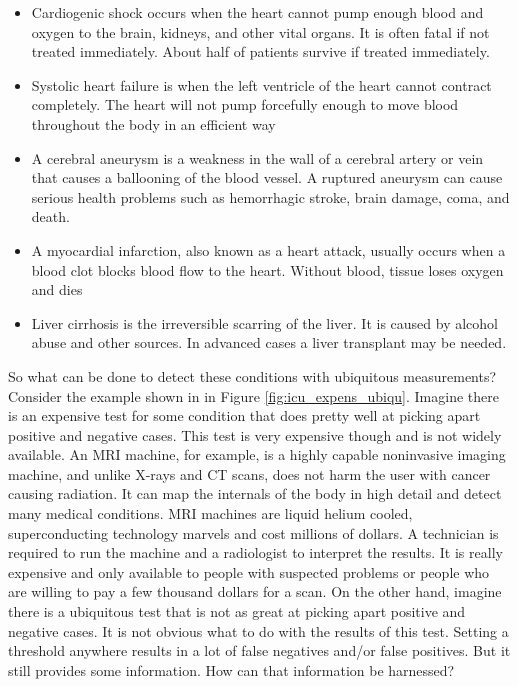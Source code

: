 \begin{itemize}
    \item Cardiogenic shock occurs when the heart cannot pump enough blood and oxygen to the brain, kidneys, and other vital organs.  It is often fatal if not treated immediately.  About half of patients survive if treated immediately.
    \item Systolic heart failure is when the left ventricle of the heart cannot contract completely.  The heart will not pump forcefully enough to move blood throughout the body in an efficient way
    \item A cerebral aneurysm is a weakness in the wall of a cerebral artery or vein that causes a ballooning of the blood vessel.  A ruptured aneurysm can cause serious health problems such as hemorrhagic stroke, brain damage, coma, and death.
    \item A myocardial infarction, also known as a heart attack, usually occurs when a blood clot blocks blood flow to the heart.  Without blood, tissue loses oxygen and dies
    \item Liver cirrhosis is the irreversible scarring of the liver.  It is caused by alcohol abuse and other sources.  In advanced cases a liver transplant may be needed.
\end{itemize}

So what can be done to detect these conditions with ubiquitous measurements?   Consider the example shown in in Figure \ref{fig:icu_expens_ubiqu}.  Imagine there is an expensive test for some condition that does pretty well at picking apart positive and negative cases.  This test is very expensive though and is not widely available.  An MRI machine, for example, is a highly capable noninvasive imaging machine, and unlike X-rays and CT scans, does not harm the user with cancer causing radiation.  It can map the internals of the body in high detail and detect many medical conditions.  MRI machines are liquid helium cooled, superconducting technology marvels and cost millions of dollars.  A technician is required to run the machine and a radiologist to interpret the results.  It is really expensive and only available to people with suspected problems or people who are willing to pay a few thousand dollars for a scan. On the other hand, imagine there is a ubiquitous test that is not as great at picking apart positive and negative cases.  It is not obvious what to do with the results of this test.  Setting a threshold anywhere results in a lot of false negatives and/or false positives. But it still provides some information.  How can that information be harnessed? 

